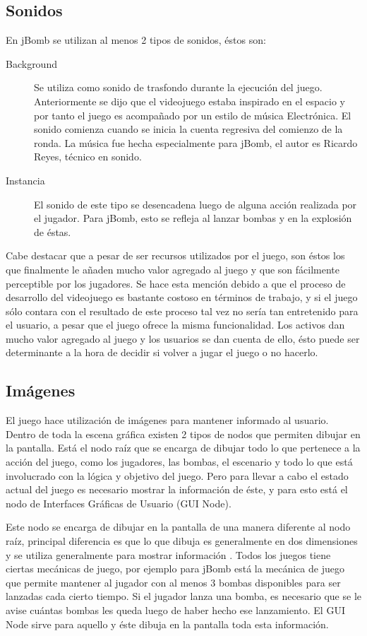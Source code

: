 \documentclass[a4paper,12pt,openany,oneside]{book}
\begin{document}
\subsection{Sonidos}
En jBomb se utilizan al menos 2 tipos de sonidos, éstos son:
\begin{description}
\item[Background] Se utiliza como sonido de trasfondo durante la ejecución del juego. Anteriormente se dijo que el videojuego estaba inspirado en el espacio y por tanto el juego es acompañado por un estilo de música Electrónica. El sonido comienza cuando se inicia la cuenta regresiva del comienzo de la ronda. La música fue hecha especialmente para jBomb, el autor es Ricardo Reyes, técnico en sonido.
\item[Instancia] El sonido de este tipo se desencadena luego de alguna acción realizada por el jugador. Para jBomb, esto se refleja al lanzar bombas y en la explosión de éstas.
\end{description}
Cabe destacar que a pesar de ser recursos utilizados por el juego, son éstos los que finalmente le añaden mucho valor agregado al juego y que son fácilmente perceptible por los jugadores. Se hace esta mención debido a que el proceso de desarrollo del videojuego es bastante costoso en términos de trabajo, y si el juego sólo contara con el resultado de este proceso tal vez no sería tan entretenido para el usuario, a pesar que el juego ofrece la misma funcionalidad. Los activos dan mucho valor agregado al juego y los usuarios se dan cuenta de ello, ésto puede ser determinante a la hora de decidir si volver a jugar el juego o no hacerlo.
\subsection{Imágenes} El juego hace utilización de imágenes para mantener informado al usuario. Dentro de toda la escena gráfica existen 2 tipos de nodos que permiten dibujar en la pantalla. Está el nodo raíz \cite{BEGINNERS} que se encarga de dibujar todo lo que pertenece a la acción del juego, como los jugadores, las bombas, el escenario y todo lo que está involucrado con la lógica y objetivo del juego. Pero para llevar a cabo el estado actual del juego es necesario mostrar la información de éste, y para esto está el nodo de Interfaces Gráficas de Usuario (GUI Node).

Este nodo se encarga de dibujar en la pantalla de una manera diferente al nodo raíz, principal diferencia es que lo que dibuja es generalmente en dos dimensiones y se utiliza generalmente para mostrar información \cite{BEGINNERS}. Todos los juegos tiene ciertas mecánicas de juego, por ejemplo para jBomb está la mecánica de juego que permite mantener al jugador con al menos 3 bombas disponibles para ser lanzadas cada cierto tiempo. Si el jugador lanza una bomba, es necesario que se le avise cuántas bombas les queda luego de haber hecho ese lanzamiento.  El GUI Node sirve para aquello y éste dibuja en la pantalla toda esta información.
\end{document}
